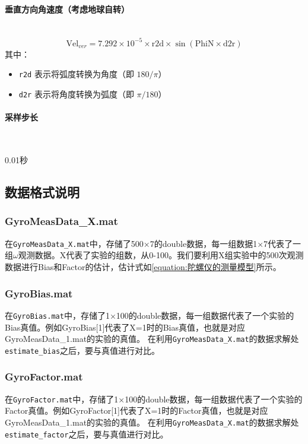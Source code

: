 \documentclass[openany,12pt,UTF8]{ctexart}
\begin{document}
\paragraph{垂直方向角速度（考虑地球自转）}\
\begin{equation}
    \text{Vel}_{ver} = 7.292 \times 10^{-5} \times \text{r2d} \times \sin(\text{PhiN} \times \text{d2r})
\end{equation}
其中：
\begin{itemize}
    \item \texttt{r2d} 表示将弧度转换为角度（即 $180/\pi$）
    \item \texttt{d2r} 表示将角度转换为弧度（即 $\pi/180$）
\end{itemize}

\paragraph{采样步长}\

0.01秒

\subsection{数据格式说明}
\subsubsection{GyroMeasData\_X.mat}
在\texttt{GyroMeasData\_X.mat}中，存储了500×7的double数据，每一组数据1×7代表了一组\(\omega\)观测数据。X代表了实验的组数，从0-100。我们要利用X组实验中的500次观测数据进行Bias和Factor的估计，估计式如\autoref{equation:陀螺仪的测量模型}所示。
\subsubsection{GyroBias.mat}
在\texttt{GyroBias.mat}中，存储了1×100的double数据，每一组数据代表了一个实验的Bias真值。例如GyroBias[1]代表了X=1时的Bias真值，也就是对应GyroMeasData\_1.mat的实验的真值。
在利用\texttt{GyroMeasData\_X.mat}的数据求解处\texttt{estimate\_{bias}}之后，要与真值进行对比。
\subsubsection{GyroFactor.mat}
在\texttt{GyroFactor.mat}中，存储了1×100的double数据，每一组数据代表了一个实验的Factor真值。例如GyroFactor[1]代表了X=1时的Factor真值，也就是对应GyroMeasData\_1.mat的实验的真值。
在利用\texttt{GyroMeasData\_X.mat}的数据求解处\texttt{estimate\_{factor}}之后，要与真值进行对比。
\end{document}
